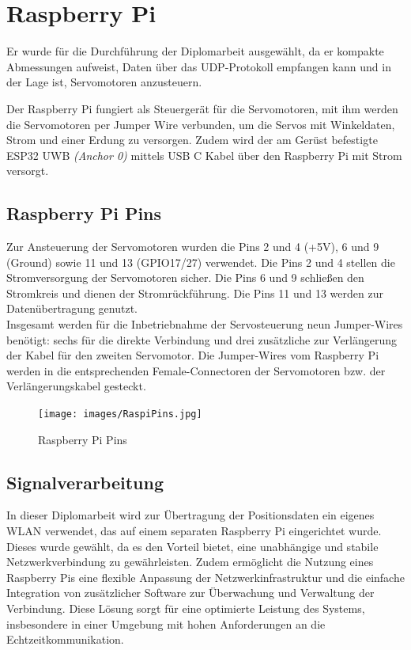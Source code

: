 \section{Raspberry Pi}
Er wurde für die Durchführung der Diplomarbeit ausgewählt, da er kompakte Abmessungen aufweist, Daten über das UDP-Protokoll empfangen kann und in der Lage ist, Servomotoren anzusteuern.

Der Raspberry Pi fungiert als Steuergerät für die Servomotoren, mit ihm werden die Servomotoren per Jumper Wire verbunden, um die Servos mit Winkeldaten, Strom und einer Erdung zu versorgen. Zudem wird der am Gerüst befestigte ESP32 UWB \textit{(Anchor 0)} mittels USB C Kabel über den Raspberry Pi mit Strom versorgt. 

\newpage
\subsection{Raspberry Pi Pins}
Zur Ansteuerung der Servomotoren wurden die Pins 2 und 4 (+5V), 6 und 9 (Ground) sowie 11 und 13 (GPIO17/27) verwendet. Die Pins 2 und 4 stellen die Stromversorgung der Servomotoren sicher. Die Pins 6 und 9 schließen den Stromkreis und dienen der Stromrückführung. Die Pins 11 und 13 werden zur Datenübertragung genutzt.\\
Insgesamt werden für die Inbetriebnahme der Servosteuerung neun Jumper-Wires benötigt: sechs für die direkte Verbindung und drei zusätzliche zur Verlängerung der Kabel für den zweiten Servomotor. Die Jumper-Wires vom Raspberry Pi werden in die entsprechenden Female-Connectoren der Servomotoren bzw. der Verlängerungskabel gesteckt.

\begin{figure}[H]
	\centering
	\texttt{[image: images/RaspiPins.jpg]}
	\caption[Raspberry Pi Pins]{Raspberry Pi Pins}
	\label{fig: Raspberry Pi Pins}
\end{figure}


\subsection{Signalverarbeitung}
In dieser Diplomarbeit wird zur Übertragung der Positionsdaten ein eigenes WLAN verwendet, das auf einem separaten Raspberry Pi eingerichtet wurde. Dieses wurde gewählt, da es den Vorteil bietet, eine unabhängige und stabile Netzwerkverbindung zu gewährleisten. Zudem ermöglicht die Nutzung eines Raspberry Pis eine flexible Anpassung der Netzwerkinfrastruktur und die einfache Integration von zusätzlicher Software zur Überwachung und Verwaltung der Verbindung. Diese Lösung sorgt für eine optimierte Leistung des Systems, insbesondere in einer Umgebung mit hohen Anforderungen an die Echtzeitkommunikation.

